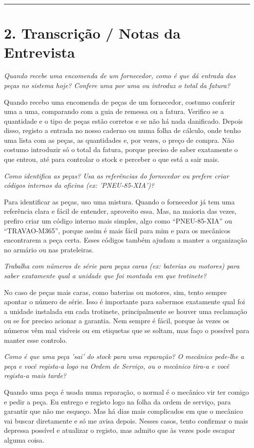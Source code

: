 \documentclass[11pt,a4paper]{article}
\newcommand{\pergunta}[1]{\item[E:] \textit{#1}}
\newcommand{\resposta}[1]{\item[R:] #1}
\begin{document}
	\hrule %
	\vspace{0.5cm}
	
	\section*{2. Transcrição / Notas da Entrevista}
	
	\begin{transcription}
		
		\pergunta{Quando recebe uma encomenda de um fornecedor, como é que dá entrada das peças no sistema hoje? Confere uma por uma ou introduz o total da fatura?}
		\resposta{Quando recebo uma encomenda de peças de um fornecedor, costumo conferir uma a uma, comparando com a guia de remessa ou a fatura. Verifico se a quantidade e o tipo de peças estão corretos e se não há nada danificado. Depois disso, registo a entrada no nosso caderno ou numa folha de cálculo, onde tenho uma lista com as peças, as quantidades e, por vezes, o preço de compra. Não costumo introduzir só o total da fatura, porque preciso de saber exatamente o que entrou, até para controlar o stock e perceber o que está a sair mais.}
		
		\pergunta{Como identifica as peças? Usa as referências do fornecedor ou prefere criar códigos internos da oficina (ex: 'PNEU-85-XIA')?}
		\resposta{Para identificar as peças, uso uma mistura. Quando o fornecedor já tem uma referência clara e fácil de entender, aproveito essa. Mas, na maioria das vezes, prefiro criar um código interno mais simples, algo como “PNEU-85-XIA” ou “TRAVAO-M365”, porque assim é mais fácil para mim e para os mecânicos encontrarem a peça certa. Esses códigos também ajudam a manter a organização no armário ou nas prateleiras.}
		
		\pergunta{Trabalha com números de série para peças caras (ex: baterias ou motores) para saber exatamente qual a unidade que foi montada em que trotinete?}
		\resposta{No caso de peças mais caras, como baterias ou motores, sim, tento sempre apontar o número de série. Isso é importante para sabermos exatamente qual foi a unidade instalada em cada trotinete, principalmente se houver uma reclamação ou se for preciso acionar a garantia. Nem sempre é fácil, porque às vezes os números vêm mal visíveis ou em etiquetas que se soltam, mas faço o possível para manter esse controlo.}
		
		\pergunta{Como é que uma peça 'sai' do stock para uma reparação? O mecânico pede-lhe a peça e você regista-a logo na Ordem de Serviço, ou o mecânico tira-a e você regista-a mais tarde?}
		\resposta{Quando uma peça é usada numa reparação, o normal é o mecânico vir ter comigo e pedir a peça. Eu entrego e registo logo na folha da ordem de serviço, para garantir que não me esqueço. Mas há dias mais complicados em que o mecânico vai buscar diretamente e só me avisa depois. Nesses casos, tento confirmar o mais depressa possível e atualizar o registo, mas admito que às vezes pode escapar alguma coisa.}
		

\end{transcription}
\end{document}
